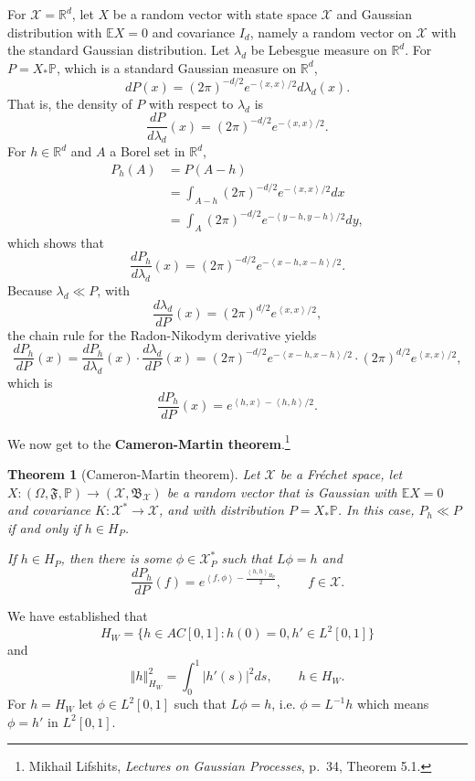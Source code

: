 \documentclass{article}
\newcommand{\inner}[2]{\left\langle #1, #2 \right\rangle}
\newcommand{\norm}[1]{\left\Vert #1 \right\Vert}
\newtheorem{theorem}{Theorem}
\theoremstyle{definition}
\begin{document}
For $\mathscr{X}=\mathbb{R}^d$, let $X$ be a random vector with state space
$\mathscr{X}$ and Gaussian distribution with $\mathbb{E} X=0$ and
covariance $I_d$, namely a random vector on $\mathscr{X}$ with the standard Gaussian distribution.
Let $\lambda_d$ be Lebesgue measure on $\mathbb{R}^d$. For $P=X_*\mathbb{P}$, which is a standard Gaussian
measure on $\mathbb{R}^d$, 
\[
dP(x) = (2\pi)^{-d/2} e^{-\inner{x}{x}/2} d\lambda_d(x).
\]
That is, the density of $P$ with respect to $\lambda_d$ is
\[
\frac{dP}{d\lambda_d}(x) =  (2\pi)^{-d/2} e^{-\inner{x}{x}/2}.
\]
For $h \in \mathbb{R}^d$ and $A$ a Borel set in $\mathbb{R}^d$,
\begin{align*}
P_h(A)& = P(A-h)\\
&= \int_{A-h}   (2\pi)^{-d/2} e^{-\inner{x}{x}/2} dx\\
&=\int_A (2\pi)^{-d/2} e^{-\inner{y-h}{y-h}/2} dy,
\end{align*}
which shows that
\[
\frac{dP_h}{d\lambda_d}(x) =  (2\pi)^{-d/2} e^{-\inner{x-h}{x-h}/2}.
\]
Because $\lambda_d \ll P$,
with
\[
\frac{d\lambda_d}{dP}(x) = (2\pi)^{d/2}  e^{\inner{x}{x}/2},
\]
the chain rule for the Radon-Nikodym derivative yields
\[
\frac{dP_h}{dP}(x) = \frac{dP_h}{d\lambda_d}(x) \cdot \frac{d\lambda_d}{dP}(x)
= (2\pi)^{-d/2} e^{-\inner{x-h}{x-h}/2} \cdot (2\pi)^{d/2}  e^{\inner{x}{x}/2},
\]
which is
\[
\frac{dP_h}{dP}(x)  = e^{\inner{h}{x}- \inner{h}{h}/2}.
\]





We now get to the \textbf{Cameron-Martin theorem}.\footnote{Mikhail Lifshits, {\em Lectures on Gaussian Processes},
p.~34, Theorem 5.1.}

\begin{theorem}[Cameron-Martin theorem]
Let $\mathscr{X}$ be a Fr\'echet space, let $X:(\Omega,\mathfrak{F},\mathbb{P}) \to (\mathscr{X},\mathfrak{B}_{\mathscr{X}})$
be a random vector that is Gaussian with $\mathbb{E} X = 0$ and covariance $K:\mathscr{X}^* \to \mathscr{X}$, and with
distribution $P=X_*\mathbb{P}$. 
In this case, $P_h \ll P$ if and only if $h \in H_P$.

If $h \in  H_P$, then there is some $\phi \in \mathscr{X}_P^*$ such that $L\phi=h$ and
\[
\frac{dP_h}{dP}(f) = e^{\inner{f}{\phi} - \frac{\inner{h}{h}_{H_P}}{2}},\qquad f \in \mathscr{X}.
\]
\end{theorem}


We have established that 
\[
H_W = \{h \in AC[0,1] : h(0) = 0, h' \in L^2[0,1]\}
\]
and 
\[
\norm{h}_{H_W}^2 = \int_0^1 |h'(s)|^2 ds,\qquad h \in H_W.
\]
For $h=H_W$ let $\phi \in L^2[0,1]$ such that $L\phi=h$,
i.e. $\phi=L^{-1}h$ which means $\phi=h'$ in $L^2[0,1]$. 
\end{document}
